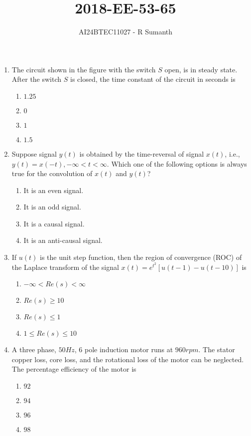 \documentclass[journal,12pt,onecolumn]{IEEEtran}
\theoremstyle{remark}
\begin{document}

\vspace{3cm}

\title{\textbf{2018-EE-53-65}}
\author{AI24BTEC11027 - R Sumanth}
\maketitle
\bigskip

\renewcommand{\thefigure}{\theenumi}
\renewcommand{\thetable}{\theenumi}
\setlength{\columnsep}{2.5em}
\begin{enumerate}

\item The circuit shown in the figure with the switch $S$ open, is in steady state. After the 
switch $S$ is closed, the time constant of the circuit in seconds is

\begin{enumerate}
    \item $1.25$
    \item $0$
    \item $1$
    \item $1.5$\\
\end{enumerate}

\item Suppose signal $y(t)$ is obtained by the time-reversal of signal $x(t)$, i.e., $y(t)=x(-t),-\infty<t<\infty.$ Which one of the following options is always true for the convolution of $x(t)$ and $y(t)$?
\begin{enumerate}
    \item It is an even signal.
    \item It is an odd signal. 
    \item It is a causal signal.
    \item It is an anti-causal signal. \\
\end{enumerate}

\item If $u(t)$ is the unit step function, then the region of convergence (ROC) of the 
Laplace transform of the signal $x(t)=e^{t^2}[u(t-1)-u(t-10)]$ is
\begin{enumerate}
    \item $-\infty < Re(s) <\infty$
    \item $Re(s)\geq 10$
    \item $Re(s)\leq1$
    \item $1\leq Re(s) \leq10$ \\
\end{enumerate}
\item A three phase, $50 Hz$, $6$ pole induction motor runs at $960 rpm$. The stator copper 
loss, core loss, and the rotational loss of the motor can be neglected. The percentage 
efficiency of the motor is
\begin{enumerate}
    \item $92$
    \item $94$
    \item $96$
    \item $98$\\
\end{enumerate}


\end{enumerate}
\end{document}
